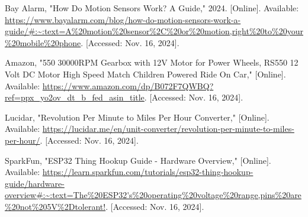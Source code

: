 \begin{thebibliography}{45}
	 Bay Alarm, "How Do Motion Sensors Work? A Guide," 2024. [Online]. Available: \url{https://www.bayalarm.com/blog/how-do-motion-sensors-work-a-guide/#:~:text=A%20motion%20sensor%2C%20or%20motion,right%20to%20your%20mobile%20phone}. [Accessed: Nov. 16, 2024]. 
	
	Amazon, "550 30000RPM Gearbox with 12V Motor for Power Wheels, RS550 12 Volt DC Motor High Speed Match Children Powered Ride On Car," [Online]. Available: \url{https://www.amazon.com/dp/B072F7QWBQ?ref=ppx_yo2ov_dt_b_fed_asin_title}. [Accessed: Nov. 16, 2024].
	
	Lucidar, "Revolution Per Minute to Miles Per Hour Converter," [Online]. Available: \url{https://lucidar.me/en/unit-converter/revolution-per-minute-to-miles-per-hour/}. [Accessed: Nov. 16, 2024].
	
	SparkFun, "ESP32 Thing Hookup Guide - Hardware Overview," [Online]. Available: \url{https://learn.sparkfun.com/tutorials/esp32-thing-hookup-guide/hardware-overview#:~:text=The%20ESP32's%20operating%20voltage%20range,pins%20are%20not%205V%2Dtolerant!}. [Accessed: Nov. 16, 2024].
	
\end{thebibliography}
